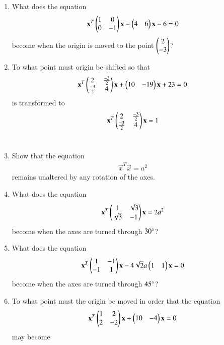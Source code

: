 \renewcommand{\theequation}{\theenumi}
\begin{enumerate}[label=\arabic*.,ref=\thesubsection.\theenumi]
\item What does the equation 
\begin{align}
\mathbf{x}^T\begin{pmatrix}1 & 0\\0 & -1\end{pmatrix}\mathbf{x}-\begin{pmatrix}4 & 6\end{pmatrix}\mathbf{x}-6=0
\end{align}
become when the origin is moved to the point $\begin{pmatrix}2\\-3\end{pmatrix}$?
\\
\solution

\item To what point must origin be shifted so that
\begin{align}\label{eq:solutions/3/4/2/eq12}
\mathbf{x}^T\begin{pmatrix}2 & \frac{-3}{2}\\\frac{-3}{2}& 4\end{pmatrix}\mathbf{x}+\begin{pmatrix} 10& -19\end{pmatrix}\mathbf{x}+23=0
\end{align}
is transformed to 
\begin{align}\label{eq:solutions/3/4/2/eq11}
\mathbf{x}^T\begin{pmatrix}2 & \frac{-3}{2}\\\frac{-3}{2}& 4\end{pmatrix}\mathbf{x}=1
\end{align}
\\
\solution

\item Show that the equation
\begin{align}
\vec{x}^T\vec{x}= a^2
\end{align}
remains unaltered by any rotation of the axes.
\item What does the equation
\begin{align}
\mathbf{x}^T\begin{pmatrix}1 & \sqrt{3}\\ \sqrt{3} & -1\end{pmatrix}\mathbf{x} = 2a^2
\end{align}
become when the axes are turned through $30\degree$?
\item What does the equation
\begin{align}
\mathbf{x}^T\begin{pmatrix}1 & -1\\-1 & 1\end{pmatrix}\mathbf{x}-4\sqrt{2}a\begin{pmatrix}1 & 1\end{pmatrix}\mathbf{x}=0
\end{align}
become when the axes are turned through $45\degree$?
\item To what point must the origin be moved in order that the equation
\begin{align}
    \mathbf{x}^T\begin{pmatrix}1 & 2\\2 & -2\end{pmatrix}\mathbf{x}+\begin{pmatrix}10 & -4\end{pmatrix}\mathbf{x}=0 \label{eq:solutions/3/4/6/eq:q1}
\end{align}
may become

\end{enumerate}

